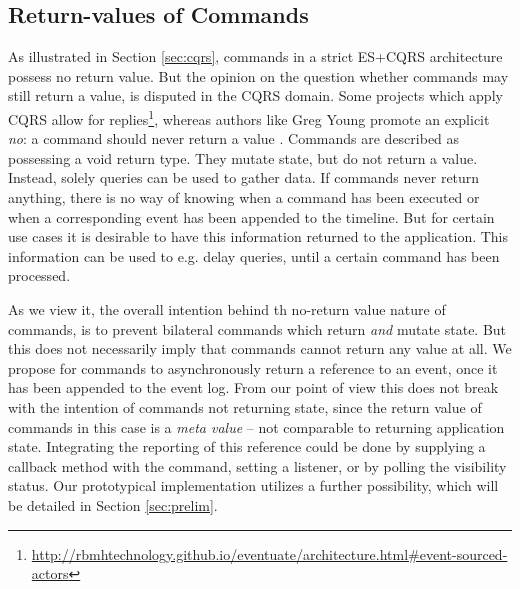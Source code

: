 \subsection{Return-values of Commands}
\label{sec:return-values}
As illustrated in Section \ref{sec:cqrs}, commands in a strict ES+CQRS 
architecture possess no return value.
%
But the opinion on the question whether commands may still return a value, is 
disputed in the CQRS domain. Some projects which apply CQRS allow for replies\footnote[1]{\href{http://rbmhtechnology.github.io/eventuate/architecture.html\#event-sourced-actors}{http://rbmhtechnology.github.io/eventuate/architecture.html\#event-sourced-actors}},
whereas authors like Greg Young promote an explicit \emph{no}: a command should 
never return a value \cite[p.17]{Young2013}. Commands are described as possessing 
a void return type. They mutate state, but do not return a value. Instead, solely 
queries can be used to gather data.
%
If commands never return anything, there is no way of knowing when a command
has been executed or when a corresponding event has been appended to the timeline.
But for certain use cases it is desirable to have this information returned
to the application. This information can be used to e.g. delay queries, until a 
certain command has been processed.

As we view it, the overall intention behind th no-return value nature of
commands, is to prevent bilateral commands which return \emph{and} mutate 
state. But this does not necessarily imply that commands cannot return any 
value at all.
We propose for commands to asynchronously return a reference to an event, 
once it has been appended to the event log. From our point of view this 
does not break with the intention of commands not returning state, since 
the return value of commands in this case is a \emph{meta value} -- not 
comparable to returning application state.
%
Integrating the reporting of this reference could be done by supplying a 
callback method with the command, setting a listener, or by polling the 
visibility status. Our prototypical implementation utilizes a further 
possibility, which will be detailed in Section \ref{sec:prelim}.




